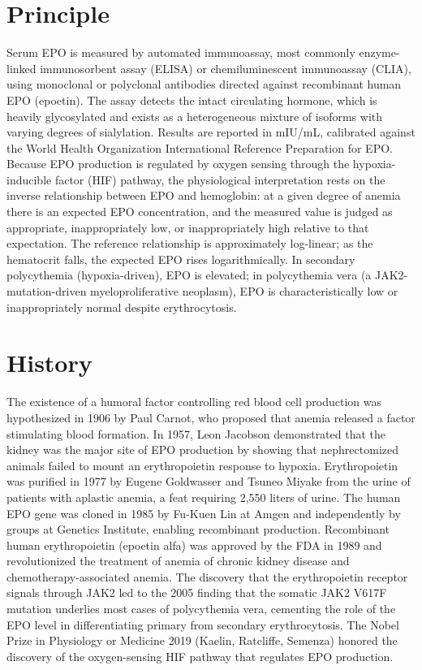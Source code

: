 \section*{Principle}
Serum EPO is measured by automated immunoassay, most commonly enzyme-linked immunosorbent assay (ELISA) or chemiluminescent immunoassay (CLIA), using monoclonal or polyclonal antibodies directed against recombinant human EPO (epoetin). The assay detects the intact circulating hormone, which is heavily glycosylated and exists as a heterogeneous mixture of isoforms with varying degrees of sialylation. Results are reported in mIU/mL, calibrated against the World Health Organization International Reference Preparation for EPO. Because EPO production is regulated by oxygen sensing through the hypoxia-inducible factor (HIF) pathway, the physiological interpretation rests on the inverse relationship between EPO and hemoglobin: at a given degree of anemia there is an expected EPO concentration, and the measured value is judged as appropriate, inappropriately low, or inappropriately high relative to that expectation. The reference relationship is approximately log-linear; as the hematocrit falls, the expected EPO rises logarithmically. In secondary polycythemia (hypoxia-driven), EPO is elevated; in polycythemia vera (a JAK2-mutation-driven myeloproliferative neoplasm), EPO is characteristically low or inappropriately normal despite erythrocytosis.

\section*{History}
The existence of a humoral factor controlling red blood cell production was hypothesized in 1906 by Paul Carnot, who proposed that anemia released a factor stimulating blood formation. In 1957, Leon Jacobson demonstrated that the kidney was the major site of EPO production by showing that nephrectomized animals failed to mount an erythropoietin response to hypoxia. Erythropoietin was purified in 1977 by Eugene Goldwasser and Tsuneo Miyake from the urine of patients with aplastic anemia, a feat requiring 2,550 liters of urine. The human EPO gene was cloned in 1985 by Fu-Kuen Lin at Amgen and independently by groups at Genetics Institute, enabling recombinant production. Recombinant human erythropoietin (epoetin alfa) was approved by the FDA in 1989 and revolutionized the treatment of anemia of chronic kidney disease and chemotherapy-associated anemia. The discovery that the erythropoietin receptor signals through JAK2 led to the 2005 finding that the somatic JAK2 V617F mutation underlies most cases of polycythemia vera, cementing the role of the EPO level in differentiating primary from secondary erythrocytosis. The Nobel Prize in Physiology or Medicine 2019 (Kaelin, Ratcliffe, Semenza) honored the discovery of the oxygen-sensing HIF pathway that regulates EPO production.

